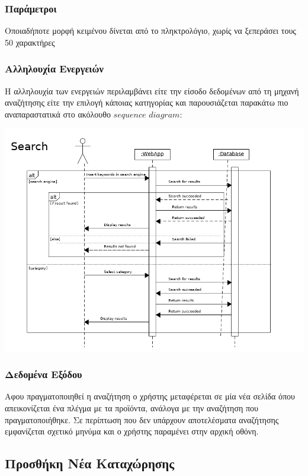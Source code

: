 \documentclass[12pt]{article}
\begin{document}
\subsubsection{Παράμετροι}

Οποιαδήποτε μορφή κειμένου δίνεται από το πληκτρολόγιο, χωρίς να ξεπεράσει τους 50 χαρακτήρες

\subsubsection{Αλληλουχία Ενεργειών}

Η αλληλουχία των ενεργειών περιλαμβάνει είτε την είσοδο δεδομένων από τη μηχανή αναζήτησης είτε την επιλογή κάποιας κατηγορίας και παρουσιάζεται παρακάτω πιο αναπαραστατικά στο ακόλουθο $sequence$ $diagram$:


\begin{center}
\includegraphics[scale=0.5]{UML/searchSequence.png}
\end{center}

\subsubsection{Δεδομένα Εξόδου}

Αφου πραγματοποιηθεί η αναζήτηση ο χρήστης μεταφέρεται σε μία νέα σελίδα όπου απεικονίζεται ένα πλέγμα με τα προϊόντα, ανάλογα με την αναζήτηση που πραγματοποιήθηκε. Σε περίπτωση που δεν υπάρχουν αποτελέσματα αναζήτησης εμφανίζεται σχετικό μηνύμα και ο χρήστης παραμένει στην αρχική οθόνη.


\subsection{Προσθήκη Νέα Καταχώρησης}
\end{document}
